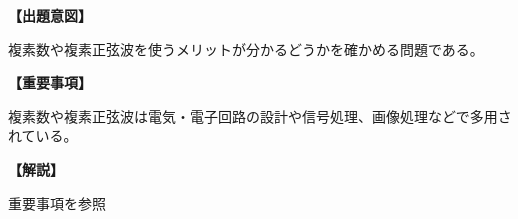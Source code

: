 \noindent \textbf{【出題意図】}

\bigskip
\noindent 複素数や複素正弦波を使うメリットが分かるどうかを確かめる問題である。

\vspace{1em}
\noindent \textbf{【重要事項】}

\medskip
\noindent 複素数や複素正弦波は電気・電子回路の設計や信号処理、画像処理などで多用されている。

\bigskip

\vspace{1em}
\noindent \textbf{【解説】}

重要事項を参照
